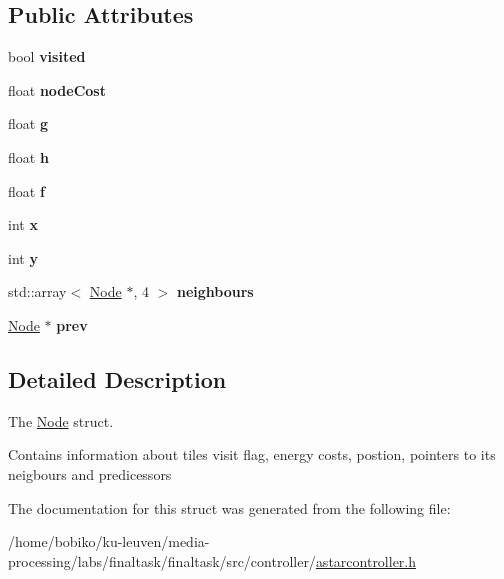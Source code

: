 \subsection*{Public Attributes}
\begin{DoxyCompactItemize}
\item 
bool {\bfseries visited}\hypertarget{structNode_aa1bdec4e775fc578632e6a2dced9e251}{}\label{structNode_aa1bdec4e775fc578632e6a2dced9e251}

\item 
float {\bfseries node\+Cost}\hypertarget{structNode_a4b2a95877effb35a6a80d12af0bee8ee}{}\label{structNode_a4b2a95877effb35a6a80d12af0bee8ee}

\item 
float {\bfseries g}\hypertarget{structNode_a914881afe2945fb2e60eb68a6c223d30}{}\label{structNode_a914881afe2945fb2e60eb68a6c223d30}

\item 
float {\bfseries h}\hypertarget{structNode_ab7d8a0250a536b3b221dd6d42e7630e0}{}\label{structNode_ab7d8a0250a536b3b221dd6d42e7630e0}

\item 
float {\bfseries f}\hypertarget{structNode_ad16e9a3090431644ea3283b07c91a6a4}{}\label{structNode_ad16e9a3090431644ea3283b07c91a6a4}

\item 
int {\bfseries x}\hypertarget{structNode_aff1029a518bdc2651007b8856f958364}{}\label{structNode_aff1029a518bdc2651007b8856f958364}

\item 
int {\bfseries y}\hypertarget{structNode_aa3e5b5240023b4528ae85057b3324202}{}\label{structNode_aa3e5b5240023b4528ae85057b3324202}

\item 
std\+::array$<$ \hyperlink{structNode}{Node} $\ast$, 4 $>$ {\bfseries neighbours}\hypertarget{structNode_a44d1de666d130924725a2a7c42daacc4}{}\label{structNode_a44d1de666d130924725a2a7c42daacc4}

\item 
\hyperlink{structNode}{Node} $\ast$ {\bfseries prev}\hypertarget{structNode_a632ea91c6a13082308f7692649a68880}{}\label{structNode_a632ea91c6a13082308f7692649a68880}

\end{DoxyCompactItemize}


\subsection{Detailed Description}
The \hyperlink{structNode}{Node} struct. 

Contains information about tiles visit flag, energy costs, postion, pointers to its neigbours and predicessors 

The documentation for this struct was generated from the following file\+:\begin{DoxyCompactItemize}
\item 
/home/bobiko/ku-\/leuven/media-\/processing/labs/finaltask/finaltask/src/controller/\hyperlink{astarcontroller_8h}{astarcontroller.\+h}\end{DoxyCompactItemize}
